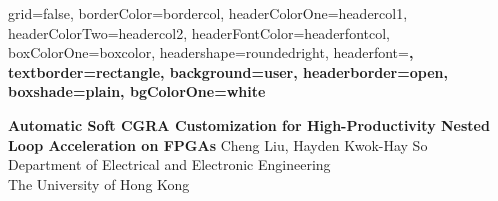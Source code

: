 \documentclass[a0paper,portrait]{baposter}
\begin{document}


\begin{poster}{
	grid=false,
	borderColor=bordercol,
	headerColorOne=headercol1,
	headerColorTwo=headercol2,
	headerFontColor=headerfontcol,
	boxColorOne=boxcolor,
	headershape=roundedright,
	headerfont=\Large\sf\bf,
	textborder=rectangle,
	background=user,
	headerborder=open,
        boxshade=plain,
        bgColorOne=white
}

{\sf\bf Automatic Soft CGRA Customization for High-Productivity 
Nested Loop Acceleration on FPGAs 
}
{
	\vspace{1em} Cheng Liu, Hayden Kwok-Hay So\\
    Department of Electrical and Electronic Engineering \\
    The University of Hong Kong
}
{
\setlength\fboxsep{0pt}
\setlength\fboxrule{0pt}
}


\end{poster}
\end{document}
